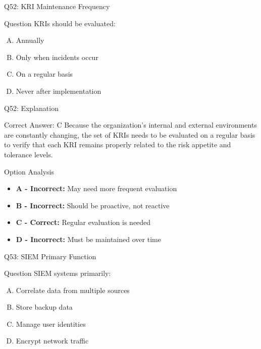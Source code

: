 \documentclass{beamer}
\begin{document}
	\begin{frame}{Q52: KRI Maintenance Frequency}
		\begin{block}{Question}
			KRIs should be evaluated:
		\end{block}
		\begin{enumerate}[(A)]
			\item Annually
			\item Only when incidents occur
			\item On a regular basis
			\item Never after implementation
		\end{enumerate}
	\end{frame}
	
	\begin{frame}{Q52: Explanation}
		\begin{block}{Correct Answer: C}
			Because the organization's internal and external environments are constantly changing, the set of KRIs needs to be evaluated on a regular basis to verify that each KRI remains properly related to the risk appetite and tolerance levels.
		\end{block}
		\begin{block}{Option Analysis}
			\begin{itemize}
				\item \textbf{A - Incorrect:} May need more frequent evaluation
				\item \textbf{B - Incorrect:} Should be proactive, not reactive
				\item \textbf{C - Correct:} Regular evaluation is needed
				\item \textbf{D - Incorrect:} Must be maintained over time
			\end{itemize}
		\end{block}
	\end{frame}
	
	\begin{frame}{Q53: SIEM Primary Function}
		\begin{block}{Question}
			SIEM systems primarily:
		\end{block}
		\begin{enumerate}[(A)]
			\item Correlate data from multiple sources
			\item Store backup data
			\item Manage user identities
			\item Encrypt network traffic
		\end{enumerate}
	\end{frame}
	
\end{document}
